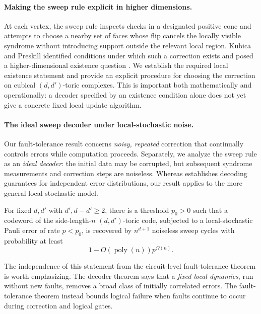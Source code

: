 \paragraph{Making the sweep rule explicit in higher dimensions.}
At each vertex, the sweep rule inspects checks in a designated positive cone and attempts to choose a nearby set of faces whose flip cancels the locally visible syndrome without introducing support outside the relevant local region.  Kubica and Preskill identified conditions under which such a correction exists and posed a higher-dimensional existence question \cite{Kubica_2019}.  We establish the required local existence statement and provide an explicit procedure for choosing the correction on cubical $(d,d')$-toric complexes.  This is important both mathematically and operationally: a decoder specified by an existence condition alone does not yet give a concrete fixed local update algorithm.

\paragraph{The ideal sweep decoder under local-stochastic noise.}
Our fault-tolerance result concerns \emph{noisy, repeated} correction that continually controls errors while computation proceeds.  Separately, we analyze the sweep rule as an \emph{ideal decoder}: the initial data may be corrupted, but subsequent syndrome measurements and correction steps are noiseless.  Whereas \cite{Kubica_2019} establishes decoding guarantees for independent error distributions, our result applies to the more general local-stochastic model.

\begin{theorem*}
For fixed $d,d'$ with $d',d-d'\geq 2$, there is a threshold $p_0>0$ such that a codeword of the side-length-$n$ $(d,d')$-toric code, subjected to a local-stochastic Pauli error of rate $p<p_0$, is recovered by $n^{d+1}$ noiseless sweep cycles with probability at least
\begin{equation*}
    1-O\!\left(\operatorname{poly}(n)\right)p^{\Omega(n)}.
\end{equation*}
\end{theorem*}

The independence of this statement from the circuit-level fault-tolerance theorem is worth emphasizing.  The decoder theorem says that a \emph{fixed local dynamics}, run without new faults, removes a broad class of initially correlated errors.  The fault-tolerance theorem instead bounds logical failure when faults continue to occur during correction and logical gates.

